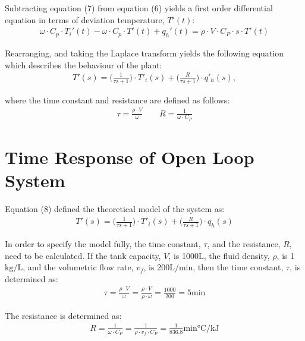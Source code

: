 \documentclass{article}
\begin{document}
Subtracting equation (7) from equation (6) yields a first order differential equation in terms of deviation temperature, $T'(t)$:
\begin{align*}
\omega \cdot C_p \cdot T_i'(t) - \omega \cdot C_p \cdot T'(t) + q_h'(t) = \rho \cdot V \cdot C_P \cdot s \cdot T'(t)
\end{align*}

Rearranging, and taking the Laplace transform yields the following equation which describes the behaviour of the plant:
\begin{align}
T'(s) = \bigg(\frac{1}{\tau s + 1}\bigg) \cdot T'_i(s) + \bigg(\frac{R}{\tau s + 1}\bigg) \cdot q'_h(s),
\end{align}

where the time constant and resistance are defined as follows:
\begin{align*}
\tau = \frac{\rho \cdot V}{\omega} \quad \quad R = \frac{1}{\omega \cdot C_P}
\end{align*}

\section{Time Response of Open Loop System}
Equation (8) defined the theoretical model of the system as:
\begin{align*}
T'(s) = \bigg(\frac{1}{\tau s + 1}\bigg) \cdot T'_i(s) + \bigg(\frac{R}{\tau s + 1}\bigg) \cdot q_h(s)
\end{align*}

In order to specify the model fully, the time constant, $\tau$, and the resistance, $R$, need to be calculated. If the tank capacity, $V$, is 1000$\si{\liter}$, the fluid density, $\rho$, is 1$\si{\kilogram\per\liter}$, and the volumetric flow rate, $v_f$, is 200$\si{\liter\per\minute}$, then the time constant, $\tau$, is determined as:
\begin{align*}
\tau = \frac{\rho \cdot V}{\omega} = \frac{\rho \cdot V}{\rho \cdot \omega} = \frac{1000}{200} = 5\si{\minute}
\end{align*}

The resistance is determined as:
\begin{align*}
R = \frac{1}{\omega \cdot C_P} = \frac{1}{\rho \cdot v_f \cdot C_P} = \frac{1}{836.8}\si{\minute\degreeCelsius\per\kilo\joule}
\end{align*}
\end{document}
